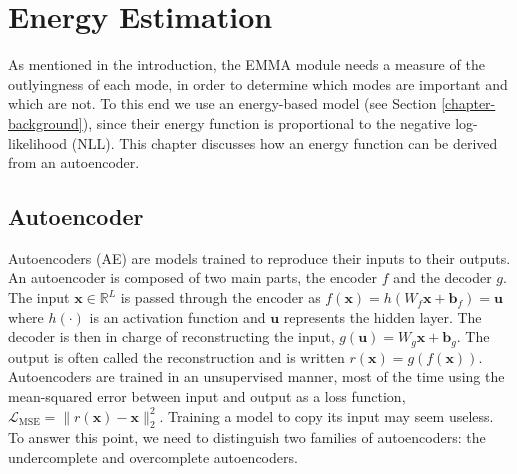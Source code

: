 \chapter{Energy Estimation} 
\label{chapter-energy-estimation} 

As mentioned in the introduction, the EMMA module needs a measure of the outlyingness of each mode, in order to determine which modes are important and which are not. To this end we use an energy-based model (see Section \ref{chapter-background}), since their energy function is proportional to the negative log-likelihood (NLL). This chapter discusses how an energy function can be derived from an autoencoder. 


\section{Autoencoder}

Autoencoders (AE) are models trained to reproduce their inputs to their outputs. An autoencoder is composed of two main parts, the encoder $f$ and the decoder $g$. The input $\mathbf{x} \in  \mathbb{R}^L$ is passed through the encoder as $f(\mathbf{x}) = h(W_f\mathbf{x} + \mathbf{b}_f) = \mathbf{u}$ where $h(\cdot)$ is an activation function and $\mathbf{u}$ represents the hidden layer. The decoder is then in charge of reconstructing the input, $g(\mathbf{u}) = W_g\mathbf{x} + \mathbf{b}_g$. The output is often called the reconstruction and is written  $r(\mathbf{x}) = g(f(\mathbf{x}))$. Autoencoders are trained in an unsupervised manner, most of the time using the mean-squared error between input and output as a loss function, $\mathcal{L}_{\text{MSE}} = \lVert r(\mathbf{x}) - \mathbf{x} \rVert_2^2$. Training a model to copy its input may seem useless. To answer this point, we need to distinguish two families of autoencoders: the undercomplete and overcomplete autoencoders.

